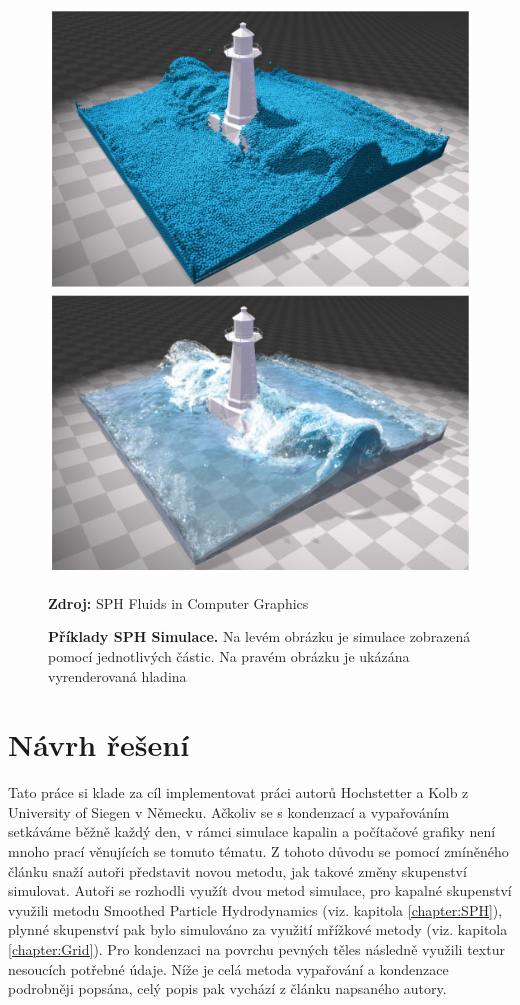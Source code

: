 \begin{figure}[h]\centering
  \centering
  \captionsetup{justification=centering}
	\includegraphics[width=0.5\linewidth]{obrazky-figures/SPHSim1_01.jpg}\hfill
	\includegraphics[width=0.5\linewidth]{obrazky-figures/SPHSim1_02.jpg}\hfill
  \caption{\textbf{Příklady SPH Simulace.} Na levém obrázku je simulace zobrazená pomocí jednotlivých částic. Na pravém obrázku je ukázána vyrenderovaná hladina}
  \textbf{Zdroj: } SPH Fluids in Computer Graphics \cite{Ihmsen14}
  \label{fig:SPHFigure}
\end{figure}

\chapter{Návrh řešení}
\label{chapter:navrh_resení}
Tato práce si klade za cíl implementovat práci \cite{Evap&Cond} autorů Hochstetter a Kolb z University of Siegen v Německu. Ačkoliv se s kondenzací a vypařováním setkáváme běžně každý den, v rámci simulace kapalin a počítačové grafiky není mnoho prací věnujících se tomuto tématu. Z tohoto důvodu se pomocí zmíněného článku snaží autoři představit novou metodu, jak takové změny skupenství simulovat. Autoři se rozhodli využít dvou metod simulace, pro kapalné skupenství využili metodu Smoothed Particle Hydrodynamics (viz. kapitola \ref{chapter:SPH}), plynné skupenství pak bylo simulováno za využití mřížkové metody (viz. kapitola \ref{chapter:Grid}). Pro kondenzaci na povrchu pevných těles následně využili textur nesoucích potřebné údaje. Níže je celá metoda vypařování a kondenzace podrobněji popsána, celý popis pak vychází z článku napsaného autory. \cite{Evap&Cond}

